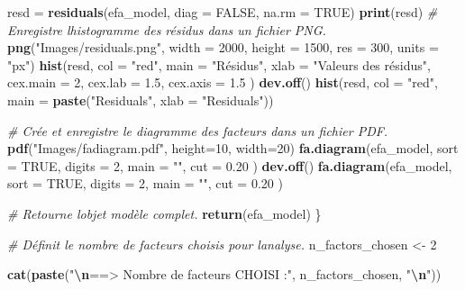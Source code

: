 \documentclass[
]{article}
\newenvironment{Shaded}{\begin{snugshade}}{\end{snugshade}}
\newcommand{\AttributeTok}[1]{\textcolor[rgb]{0.13,0.29,0.53}{#1}}
\newcommand{\CommentTok}[1]{\textcolor[rgb]{0.56,0.35,0.01}{\textit{#1}}}
\newcommand{\ConstantTok}[1]{\textcolor[rgb]{0.56,0.35,0.01}{#1}}
\newcommand{\DecValTok}[1]{\textcolor[rgb]{0.00,0.00,0.81}{#1}}
\newcommand{\FloatTok}[1]{\textcolor[rgb]{0.00,0.00,0.81}{#1}}
\newcommand{\FunctionTok}[1]{\textcolor[rgb]{0.13,0.29,0.53}{\textbf{#1}}}
\newcommand{\NormalTok}[1]{#1}
\newcommand{\OtherTok}[1]{\textcolor[rgb]{0.56,0.35,0.01}{#1}}
\newcommand{\SpecialCharTok}[1]{\textcolor[rgb]{0.81,0.36,0.00}{\textbf{#1}}}
\newcommand{\StringTok}[1]{\textcolor[rgb]{0.31,0.60,0.02}{#1}}
\begin{document}
\begin{Shaded}
\begin{Highlighting}[]
\NormalTok{  resd }\OtherTok{=} \FunctionTok{residuals}\NormalTok{(efa\_model, }\AttributeTok{diag =} \ConstantTok{FALSE}\NormalTok{, }\AttributeTok{na.rm =} \ConstantTok{TRUE}\NormalTok{)}
  \FunctionTok{print}\NormalTok{(resd)}
  \CommentTok{\# Enregistre l\textquotesingle{}histogramme des résidus dans un fichier PNG.}
  \FunctionTok{png}\NormalTok{(}\StringTok{"Images/residuals.png"}\NormalTok{, }\AttributeTok{width =} \DecValTok{2000}\NormalTok{, }\AttributeTok{height =} \DecValTok{1500}\NormalTok{, }\AttributeTok{res =} \DecValTok{300}\NormalTok{, }\AttributeTok{units =} \StringTok{"px"}\NormalTok{)}
  \FunctionTok{hist}\NormalTok{(resd, }
       \AttributeTok{col =} \StringTok{"red"}\NormalTok{, }
       \AttributeTok{main =} \StringTok{"Résidus"}\NormalTok{,}
       \AttributeTok{xlab =} \StringTok{"Valeurs des résidus"}\NormalTok{,}
       \AttributeTok{cex.main =} \DecValTok{2}\NormalTok{,}
       \AttributeTok{cex.lab =} \FloatTok{1.5}\NormalTok{,}
       \AttributeTok{cex.axis =} \FloatTok{1.5}
\NormalTok{  )}
  \FunctionTok{dev.off}\NormalTok{()}
  \FunctionTok{hist}\NormalTok{(resd, }\AttributeTok{col =} \StringTok{"red"}\NormalTok{, }\AttributeTok{main =} \FunctionTok{paste}\NormalTok{(}\StringTok{"Residuals"}\NormalTok{, }\AttributeTok{xlab =} \StringTok{"Residuals"}\NormalTok{))}
  
  \CommentTok{\# Crée et enregistre le diagramme des facteurs dans un fichier PDF.}
  \FunctionTok{pdf}\NormalTok{(}\StringTok{"Images/fadiagram.pdf"}\NormalTok{, }\AttributeTok{height=}\DecValTok{10}\NormalTok{, }\AttributeTok{width=}\DecValTok{20}\NormalTok{)}
  \FunctionTok{fa.diagram}\NormalTok{(efa\_model,}
              \AttributeTok{sort =} \ConstantTok{TRUE}\NormalTok{,}
              \AttributeTok{digits =} \DecValTok{2}\NormalTok{,}
              \AttributeTok{main =} \StringTok{""}\NormalTok{,}
              \AttributeTok{cut =} \FloatTok{0.20}
\NormalTok{  )}
  \FunctionTok{dev.off}\NormalTok{()}
  \FunctionTok{fa.diagram}\NormalTok{(efa\_model,}
              \AttributeTok{sort =} \ConstantTok{TRUE}\NormalTok{,}
              \AttributeTok{digits =} \DecValTok{2}\NormalTok{,}
              \AttributeTok{main =} \StringTok{""}\NormalTok{,}
              \AttributeTok{cut =} \FloatTok{0.20}
\NormalTok{  )}

  \CommentTok{\# Retourne l\textquotesingle{}objet modèle complet.}
  \FunctionTok{return}\NormalTok{(efa\_model)}
\NormalTok{\}}

\CommentTok{\# Définit le nombre de facteurs choisis pour l\textquotesingle{}analyse.}
\NormalTok{n\_factors\_chosen }\OtherTok{\textless{}{-}} \DecValTok{2}

\FunctionTok{cat}\NormalTok{(}\FunctionTok{paste}\NormalTok{(}\StringTok{"}\SpecialCharTok{\textbackslash{}n}\StringTok{==\textgreater{} Nombre de facteurs CHOISI :"}\NormalTok{, n\_factors\_chosen, }\StringTok{"}\SpecialCharTok{\textbackslash{}n}\StringTok{"}\NormalTok{))}
\end{Highlighting}
\end{Shaded}
\end{document}

